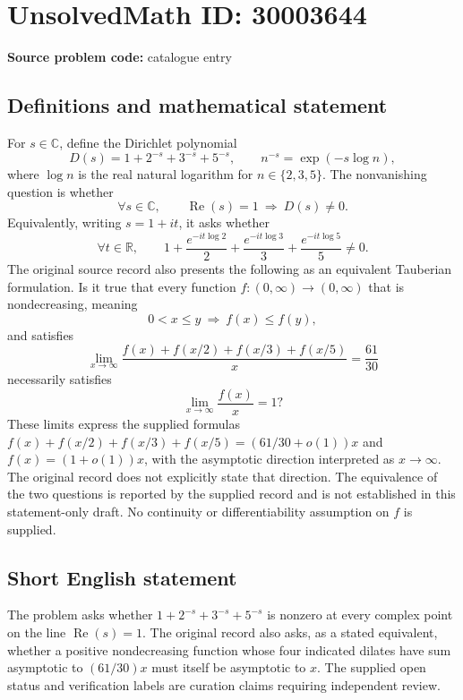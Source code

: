 \documentclass[11pt]{article}
\newcommand{\R}{\mathbb{R}}
\newcommand{\C}{\mathbb{C}}
\begin{document}
\section*{UnsolvedMath ID: 30003644}
\textbf{Source problem code:} catalogue entry
\subsection{Definitions and mathematical statement}
For \(s\in\C\), define the Dirichlet polynomial
\[
D(s)=1+2^{-s}+3^{-s}+5^{-s},\qquad n^{-s}=\exp(-s\log n),
\]
where \(\log n\) is the real natural logarithm for \(n\in\{2,3,5\}\).
The nonvanishing question is whether
\[
\forall s\in\C,\qquad \operatorname{Re}(s)=1\ \Longrightarrow\ D(s)\ne0.
\]
Equivalently, writing \(s=1+it\), it asks whether
\[
\forall t\in\R,\qquad
1+\frac{e^{-it\log 2}}{2}+\frac{e^{-it\log 3}}{3}+\frac{e^{-it\log 5}}{5}\ne0.
\]
The original source record also presents the following as an equivalent Tauberian formulation. Is it true that every function \(f:(0,\infty)\to(0,\infty)\) that is nondecreasing, meaning
\[
0<x\le y\ \Longrightarrow\ f(x)\le f(y),
\]
and satisfies
\[
\lim_{x\to\infty}\frac{f(x)+f(x/2)+f(x/3)+f(x/5)}{x}=\frac{61}{30}
\]
necessarily satisfies
\[
\lim_{x\to\infty}\frac{f(x)}{x}=1?
\]
These limits express the supplied formulas \(f(x)+f(x/2)+f(x/3)+f(x/5)=(61/30+o(1))x\) and \(f(x)=(1+o(1))x\), with the asymptotic direction interpreted as \(x\to\infty\). The original record does not explicitly state that direction. The equivalence of the two questions is reported by the supplied record and is not established in this statement-only draft. No continuity or differentiability assumption on \(f\) is supplied.
\subsection{Short English statement}
The problem asks whether \(1+2^{-s}+3^{-s}+5^{-s}\) is nonzero at every complex point on the line \(\operatorname{Re}(s)=1\). The original record also asks, as a stated equivalent, whether a positive nondecreasing function whose four indicated dilates have sum asymptotic to \((61/30)x\) must itself be asymptotic to \(x\). The supplied open status and verification labels are curation claims requiring independent review.
\end{document}

